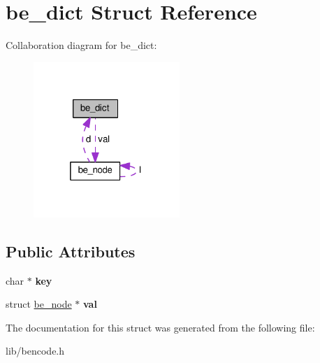 \hypertarget{structbe__dict}{}\section{be\+\_\+dict Struct Reference}
\label{structbe__dict}


Collaboration diagram for be\+\_\+dict\+:\nopagebreak
\begin{figure}[H]
\begin{center}
\leavevmode
\includegraphics[width=157pt]{structbe__dict__coll__graph}
\end{center}
\end{figure}
\subsection*{Public Attributes}
\begin{DoxyCompactItemize}
\item 
\mbox{\label{structbe__dict_a6ae73ce3648305247414d7565172ce68}} 
char $\ast$ {\bfseries key}
\item 
\mbox{\label{structbe__dict_ae6dea60cf197f99318e44410440ec6af}} 
struct \hyperlink{structbe__node}{be\+\_\+node} $\ast$ {\bfseries val}
\end{DoxyCompactItemize}


The documentation for this struct was generated from the following file\+:\begin{DoxyCompactItemize}
\item 
lib/bencode.\+h\end{DoxyCompactItemize}
